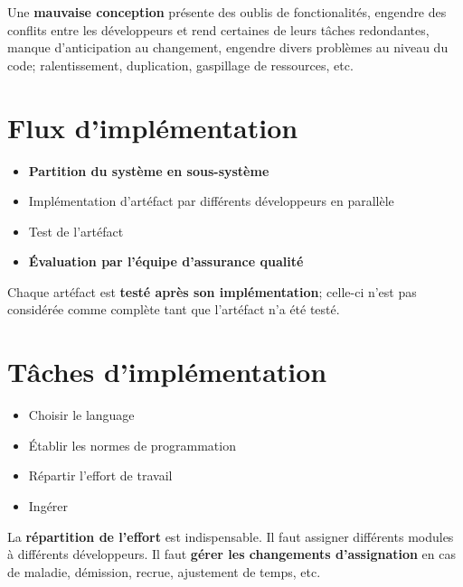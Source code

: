 \documentclass[16pt]{report}
\begin{document}
\begin{multicols*}{2}
    Une \textbf{mauvaise conception}  présente des oublis de fonctionalités, engendre des conflits 
    entre les développeurs et rend certaines de leurs tâches redondantes, manque d'anticipation au 
    changement, engendre divers problèmes au niveau du code; ralentissement, duplication, gaspillage de ressources, 
    etc. 

    \section{Flux d'implémentation}

    \begin{itemize}
        \item \textbf{Partition du système en sous-système}  
        \item Implémentation d'artéfact par différents développeurs en parallèle 
        \item Test de l'artéfact 
        \item \textbf{Évaluation par l'équipe d'assurance qualité}  
    \end{itemize}

    \begin{note}{}{}
        Chaque artéfact est \textbf{testé après son implémentation}; celle-ci n'est pas considérée comme 
        complète tant que l'artéfact n'a été testé. 
    \end{note}                          
            
    \section{Tâches d'implémentation}

    \begin{itemize}
        \item Choisir le language 
        \item Établir les normes de programmation 
        \item Répartir l'effort de travail 
        \item Ingérer
    \end{itemize}

    \begin{note}{}{}
        La \textbf{répartition de l'effort} est indispensable. Il faut \textcolor{myb}{assigner} différents 
        modules à différents développeurs. Il faut \textbf{gérer les changements d'assignation} 
        en cas de maladie, démission, recrue, ajustement de temps, etc. 
    \end{note}


\end{multicols*}
\end{document}
